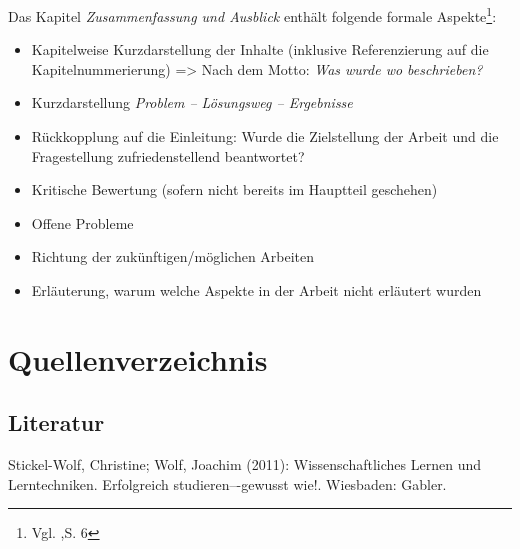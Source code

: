 \documentclass[a4paper,12pt,oneside]{article}
\begin{document}
    \vspace{1cm}
 \begin{tcolorbox}[title={Inhalte der \textit{Zusammenfassung und Ausblick}}]
Das Kapitel \textit{Zusammenfassung und Ausblick} enthält folgende formale Aspekte\footnote{Vgl. \cite{BBoJ},S. 6}:
\begin{itemize}
\item Kapitelweise Kurzdarstellung der Inhalte (inklusive Referenzierung auf die Kapitelnummerierung) => Nach dem Motto: \textit{Was wurde wo beschrieben?}
\item Kurzdarstellung \textit{Problem – Lösungsweg – Ergebnisse}
\item Rückkopplung auf die Einleitung: Wurde die Zielstellung der Arbeit und die Fragestellung zufriedenstellend beantwortet?
\item Kritische Bewertung (sofern nicht bereits im Hauptteil geschehen)
\item Offene Probleme
\item Richtung der zukünftigen/möglichen Arbeiten
\item Erläuterung, warum welche Aspekte in der Arbeit nicht erläutert wurden
\end{itemize}
  \end{tcolorbox}
   
   \newpage
    \thispagestyle{empty}
   \section{Quellenverzeichnis}
     \subsection{Literatur}
     \renewcommand{\refname}{} %
     \begin{thebibliography}{SW11} %
        Stickel-Wolf, Christine; Wolf, Joachim (2011): Wissenschaftliches Lernen und Lerntechniken. Erfolgreich studieren–-gewusst wie!. Wiesbaden: Gabler. 
     \end{thebibliography} 
          
\end{document}
